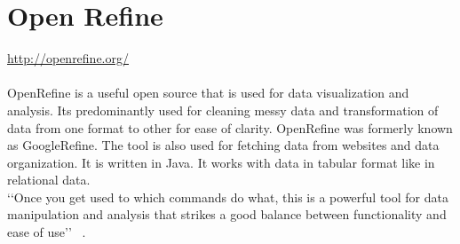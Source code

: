\section{Open Refine}
\url{http://openrefine.org/} \\
\\
OpenRefine is a useful open source that is used for data visualization and analysis. 
Its predominantly used for cleaning messy data and transformation of data from one format to other for ease of clarity.
OpenRefine was formerly known as GoogleRefine. The tool is also used for fetching data from websites and data organization.
It is written in Java. It works with data in tabular format like in relational data.\\
‘‘Once you get used to which commands do what, this is a powerful tool for data manipulation and analysis
that strikes a good balance between functionality and ease of use’’ ~\cite{hid-sp18-417-openrefine}.

